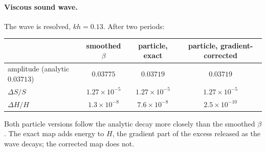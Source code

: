 \documentclass[11pt,aps,preprint,nofootinbib,superscriptaddress,tightenlines]{revtex4-2}
\let\oldparagraph\paragraph
\renewcommand{\paragraph}{\par\bigskip\oldparagraph}
\begin{document}
\paragraph{Viscous sound wave.}  The wave is resolved, $kh=0.13$.  After two
periods:
\begin{center}
\begin{tabular}{l c c c}
\hline\hline
 & smoothed $\beta$ & particle, exact & particle, gradient-corrected\\
\hline
amplitude (analytic $0.03713$) & $0.03775$ & $0.03719$ & $0.03719$\\
$\Delta S/S$ & $1.27\times10^{-5}$ & $1.27\times10^{-5}$ & $1.27\times10^{-5}$\\
$\Delta H/H$ & $1.3\times10^{-8}$ & $7.6\times10^{-8}$ & $2.5\times10^{-10}$\\
\hline\hline
\end{tabular}
\end{center}
Both particle versions follow the analytic decay more closely than the smoothed
$\beta$.  The exact map adds energy to $H$, the gradient part of the excess
released as the wave decays; the corrected map does not.
\end{document}
